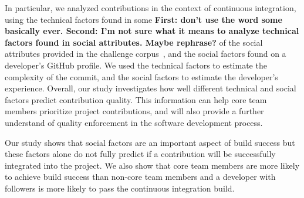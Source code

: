 \documentclass[10pt, conference]{IEEEtran}
\newcommand{\todo}[1]
  {{\scriptsize \textbf{\color{red} {#1}}}}
\begin{document}
In particular, we analyzed contributions in the 
context of continuous integration, using the technical factors found in
some\todo{First: don't use the word some basically ever.  Second: I'm not sure
  what it means to analyze technical factors found in social attributes.  Maybe rephrase?} of the social attributes provided in the challenge
corpus~\cite{msr17challenge}, and the social factors found on a developer's
GitHub profile.  We used the technical factors to estimate the complexity of the
commit, and the social factors to estimate the developer's experience.
Overall, our study investigates how well different technical and social factors predict
contribution quality. This information can help core team members prioritize project
contributions, and will also provide a further understand of quality enforcement
in the software development process.

Our study shows that social factors are an important aspect of build success but
these factors alone do not fully predict if a contribution will be successfully 
integrated into the project. We also show
that core team members are more likely to achieve build success than non-core
team members and a developer with followers is more likely to pass the
continuous integration build.
\end{document}
